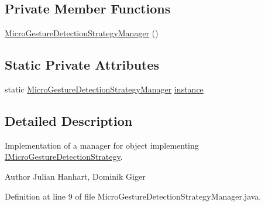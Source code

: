 \subsection*{Private Member Functions}
\begin{DoxyCompactItemize}
\item 
\hyperlink{classch_1_1zhaw_1_1ba10__bsha__1_1_1strategies_1_1MicroGestureDetectionStrategyManager_a9a48672953f53963978788452f6cc59b}{MicroGestureDetectionStrategyManager} ()
\end{DoxyCompactItemize}
\subsection*{Static Private Attributes}
\begin{DoxyCompactItemize}
\item 
static \hyperlink{classch_1_1zhaw_1_1ba10__bsha__1_1_1strategies_1_1MicroGestureDetectionStrategyManager}{MicroGestureDetectionStrategyManager} \hyperlink{classch_1_1zhaw_1_1ba10__bsha__1_1_1strategies_1_1MicroGestureDetectionStrategyManager_aad9a400795f90d61a23575fc4e0be2a0}{instance}
\end{DoxyCompactItemize}


\subsection{Detailed Description}
Implementation of a manager for object implementing \hyperlink{interfacech_1_1zhaw_1_1ba10__bsha__1_1_1strategies_1_1IMicroGestureDetectionStrategy}{IMicroGestureDetectionStrategy}.

\begin{DoxyAuthor}{Author}
Julian Hanhart, Dominik Giger 
\end{DoxyAuthor}


Definition at line 9 of file MicroGestureDetectionStrategyManager.java.

